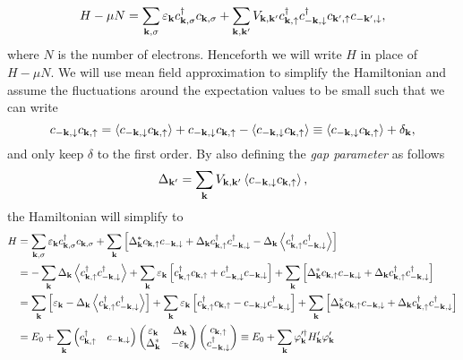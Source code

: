 \begin{equation}
    H-\mu N = \sum_{\bf{k},\sigma} \varepsilon_{\bf{k}} c_{\bf{k},\sigma}^{\dagger} c_{\bf{k},\sigma} + \sum_{\bf{k,k'}} V_{\bf{k,k'}} c_{\bf{k},\uparrow}^{\dagger} c_{\bf{-k},\downarrow}^{\dagger}  c_{\bf{k'},\uparrow} c_{-\bf{k'},\downarrow},
    \label{Ham-2-2}
\end{equation}
where $N$ is the number of electrons. Henceforth we will write $H$ in place of $H-\mu N$. We will use mean field approximation to simplify the Hamiltonian and assume the fluctuations around the expectation values to be small such that we can write 
\begin{equation}
    c_{-\bf{k},\downarrow}c_{\bf{k},\uparrow} = \left< c_{-\bf{k},\downarrow} c_{\bf{k},\uparrow} \right> + c_{-\bf{k},\downarrow}c_{\bf{k},\uparrow} - \left< c_{-\bf{k},\downarrow} c_{\bf{k},\uparrow} \right> \equiv \left< c_{-\bf{k},\downarrow} c_{\bf{k},\uparrow} \right> + \delta_{\bf{k}},
\end{equation}
and only keep $\delta$ to the first order. By also defining the \textit{gap parameter} as follows
\begin{equation}
    \Delta_{\bf{k'}} = \sum_{\bf{k}} V_{\bf{k,k'}}\left< c_{-\bf{k},\downarrow} c_{\bf{k},\uparrow} \right>,
\label{gap}
\end{equation}
the Hamiltonian will simplify to
\begin{equation}
\begin{split}
    H &= \sum_{\bf{k},\sigma} \varepsilon_{\bf{k}} c_{\bf{k},\sigma}^{\dagger} c_{\bf{k},\sigma} + \sum_{\bf{k}} \left[ \Delta_{\bf{k}}^*c_{\bf{k},\uparrow} c_{\bf{-k},\downarrow} + \Delta_{\bf{k}}c_{\bf{k},\uparrow}^{\dagger} c_{\bf{-k},\downarrow}^{\dagger} - \Delta_{\bf{k}}\left<c_{\bf{k},\uparrow}^{\dagger} c_{-\bf{k},\downarrow}^{\dagger} \right> \right]
    \\
    &= -\sum_{\bf{k}} \Delta_{\bf{k}}\left<c_{\bf{k},\uparrow}^{\dagger} c_{-\bf{k},\downarrow}^{\dagger} \right> + \sum_{\bf{k}} \varepsilon_{\bf{k}} \left[c_{\bf{k},\uparrow}^{\dagger} c_{\bf{k},\uparrow} + c_{-\bf{k},\downarrow}^{\dagger} c_{-\bf{k},\downarrow} \right] + \sum_{\bf{k}} \left[ \Delta_{\bf{k}}^*c_{\bf{k},\uparrow} c_{\bf{-k},\downarrow} + \Delta_{\bf{k}}c_{\bf{k},\uparrow}^{\dagger} c_{\bf{-k},\downarrow}^{\dagger} \right]
    \\
    &=
    \sum_{\bf{k}} \left[ \varepsilon_{\mathbf{k}} - \Delta_{\bf{k}}\left<c_{\bf{k},\uparrow}^{\dagger} c_{-\bf{k},\downarrow}^{\dagger} \right> \right] + \sum_{\bf{k}} \varepsilon_{\bf{k}} \left[c_{\bf{k},\uparrow}^{\dagger} c_{\bf{k},\uparrow} - c_{-\bf{k},\downarrow} c_{-\bf{k},\downarrow}^{\dagger}  \right] + \sum_{\bf{k}} \left[ \Delta_{\bf{k}}^*c_{\bf{k},\uparrow} c_{\bf{-k},\downarrow} + \Delta_{\bf{k}}c_{\bf{k},\uparrow}^{\dagger} c_{\bf{-k},\downarrow}^{\dagger} \right]
    \\
    &= E_0 + \sum_{\bf{k}}
    \begin{pmatrix}
        c_{\bf{k},\uparrow}^{\dagger} & c_{-\bf{k},\downarrow}
    \end{pmatrix}
    \begin{pmatrix}
        \varepsilon_{\bf{k}} & \Delta_{\bf{k}}\\
        \Delta_{\bf{k}}^* & -\varepsilon_{\bf{k}} 
    \end{pmatrix}
    \begin{pmatrix}
        c_{\bf{k},\uparrow} \\ c_{-\bf{k},\downarrow}^{\dagger}
    \end{pmatrix}
    \equiv E_0 + \sum_{\mathbf{k}}\varphi_{\mathbf{k}}'^{\dagger}H_{\mathbf{k}}'\varphi_{\mathbf{k}}'
\end{split}
\label{Ham-2-3}
\end{equation}

